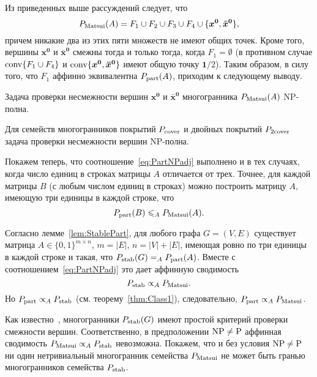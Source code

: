 Из приведенных выше рассуждений следует, что 
\[
P_{\textup{Matsui}}(A) = F_1 \cup F_2 \cup F_3 \cup F_4 \cup \{\bm{x^0}, \bm{\bar{x}^0}\},
\]
причем никакие два из этих пяти множеств не имеют общих точек.
Кроме того, вершины $\bm{x^0}$ и $\bm{\bar{x}^0}$ смежны тогда и только тогда, когда $F_1 = \emptyset$ (в противном случае $\operatorname{conv}\{F_1 \cup F_4\}$ и $\operatorname{conv}\{\bm{x^0}, \bm{\bar{x}^0}\}$ имеют общую точку $\bm{1}/2$).
Таким образом, в силу того, что $F_1$ аффинно эквивалентна $P_{\textup{part}}(A)$, приходим к следующему выводу.

\begin{theorem}
Задача проверки несмежности вершин $\bm{x^0}$ и $\bm{\bar{x}^0}$ многогранника $P_{\textup{Matsui}}(A)$ NP-полна.
\end{theorem}
\begin{corollary}
Для семейств многогранников покрытий $P_{\textup{cover}}$ и двойных покрытий $P_{\textup{2cover}}$ задача проверки несмежности вершин NP-полна.
\end{corollary}	

Покажем теперь, что соотношение~\eqref{eq:PartNPadj} выполнено и в тех случаях, когда число единиц в строках матрицы $A$ отличается от трех.
Точнее, для каждой матрицы $B$ (с любым числом единиц в строках) можно построить матрицу $A$, имеющую три единицы в каждой строке, что
\[
P_{\textup{part}}(B) \leqslant_A P_{\textup{Matsui}}(A).
\]

Согласно лемме~\ref{lem:StablePart}, для любого графа $G=(V,E)$ существует матрица $A\in\{0,1\}^{m\times n}$, $m = |E|$, $n = |V|+|E|$, имеющая ровно по три единицы в каждой строке и такая, что $P_{\textup{stab}}(G) =_A P_{\textup{part}}(A)$. Вместе с соотношением~\eqref{eq:PartNPadj} это дает аффинную сводимость 
\[
P_{\textup{stab}} \propto_A P_{\textup{Matsui}}. 
\]
Но $P_{\textup{part}} \propto_A P_{\textup{stab}}$ (см. теорему~\ref{thm:Class1}), следовательно, $P_{\textup{part}} \propto_A P_{\textup{Matsui}}$.

Как известно~\cite{Chvatal:1975}, многогранники $P_{\textup{stab}}(G)$ имеют простой критерий проверки смежности вершин.
Соответственно, в предположении $\textup{NP} \ne \textup{P}$ аффинная сводимость $P_{\textup{Matsui}} \propto_A P_{\textup{stab}}$ невозможна.
Покажем, что и без условия $\textup{NP} \ne \textup{P}$ ни один
нетривиальный многогранник семейства $P_{\textup{Matsui}}$ не может быть гранью многогранников семейства $P_{\textup{stab}}$.

